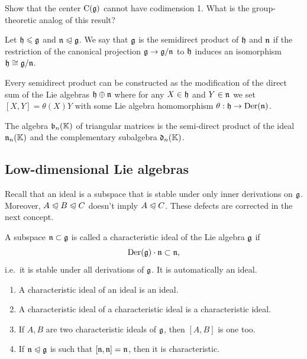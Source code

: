 \begin{xca}
    Show that the center $\mathrm{C}(\mathfrak{g})$ cannot have codimension 1. What is the group-theoretic analog of this result?
\end{xca}


\begin{defn}
    Let $\mathfrak{h}\leqslant \mathfrak{g}$ and $\mathfrak{n}\trianglelefteqslant \mathfrak{g}$. We say that $\mathfrak{g}$ is the semidirect product of $\mathfrak{h}$ and $\mathfrak{n}$ if the restriction of the canonical projection $\mathfrak{g}\to \mathfrak{g}\slash\mathfrak{n}$ to $\mathfrak{h}$ induces an isomorphism $\mathfrak{h}\cong \mathfrak{g}\slash\mathfrak{n}$.

    Every semidirect product can be constructed as the modification of the direct sum of the Lie algebras $\mathfrak{h}\oplus\mathfrak{n}$ where for any $X\in \mathfrak{h}$ and $Y\in\mathfrak{n}$ we set $[X,Y]=\theta(X)Y$ with some Lie algebra homomorphism $\theta:\mathfrak{h}\to \operatorname{Der}(\mathfrak{n})$.
\end{defn}

\begin{example}
    The algebra $\mathfrak{b}_n(\mathbb{K})$ of triangular matrices is the semi-direct product of the ideal $\mathfrak{n}_n(\mathbb{K})$ and the complementary subalgebra $\mathfrak{d}_n(\mathbb{K})$.
\end{example}





\subsection{Low-dimensional Lie algebras}

Recall that an ideal is a subspace that is stable under only inner derivations on $\mathfrak{g}$. Moreover, $A\trianglelefteqslant B\trianglelefteqslant C$ doesn't imply $A\trianglelefteqslant C$. These defects are corrected in the next concept.

\begin{defn}
    A subspace $\mathfrak{n}\subset \mathfrak{g}$ is called a characteristic ideal of the Lie algebra $\mathfrak{g}$ if 
    \[\operatorname{Der}(\mathfrak{g})\cdot \mathfrak{n}\subset \mathfrak{n},\]
    i.e.~it is stable under all derivations of $\mathfrak{g}$. It is automatically an ideal.
\end{defn}

\begin{xca}
\begin{enumerate}
    \item A characteristic ideal of an ideal is an ideal.
    \item A characteristic ideal of a characteristic ideal is a characteristic ideal.
    \item If $A,B$ are two characteristic ideals of $\mathfrak{g}$, then $[A,B]$ is one too.
    \item If $\mathfrak{n}\trianglelefteqslant \mathfrak{g}$ is such that $[\mathfrak{n},\mathfrak{n}]=\mathfrak{n}$, then it is characteristic.
\end{enumerate}
\end{xca}

